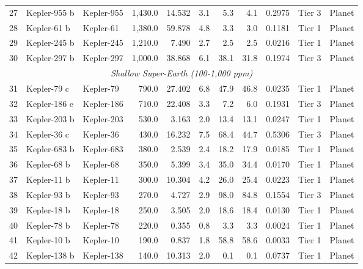{\begin{longtable}{r l l r r r r r r l l}
27 & Kepler-955 b     & Kepler-955   &   1,430.0 &  14.532 &   3.1 &    5.3 &    4.1 &  0.2975 & Tier 3  & Planet \\
28 & Kepler-61 b      & Kepler-61    &   1,380.0 &  59.878 &   4.8 &    3.3 &    3.0 &  0.1181 & Tier 1  & Planet \\
29 & Kepler-245 b     & Kepler-245   &   1,210.0 &   7.490 &   2.7 &    2.5 &    2.5 &  0.0216 & Tier 1  & Planet \\
30 & Kepler-297 b     & Kepler-297   &   1,000.0 &  38.868 &   6.1 &   38.1 &   31.8 &  0.1974 & Tier 3  & Planet \\
\hline
\multicolumn{11}{c}{\textit{Shallow Super-Earth (100-1,000 ppm)}} \\
\hline
31 & Kepler-79 c      & Kepler-79    &     790.0 &  27.402 &   6.8 &   47.9 &   46.8 &  0.0235 & Tier 1  & Planet \\
32 & Kepler-186 e     & Kepler-186   &     710.0 &  22.408 &   3.3 &    7.2 &    6.0 &  0.1931 & Tier 3  & Planet \\
33 & Kepler-203 b     & Kepler-203   &     530.0 &   3.163 &   2.0 &   13.4 &   13.1 &  0.0247 & Tier 1  & Planet \\
34 & Kepler-36 c      & Kepler-36    &     430.0 &  16.232 &   7.5 &   68.4 &   44.7 &  0.5306 & Tier 3  & Planet \\
35 & Kepler-683 b     & Kepler-683   &     380.0 &   2.539 &   2.4 &   18.2 &   17.9 &  0.0185 & Tier 1  & Planet \\
36 & Kepler-68 b      & Kepler-68    &     350.0 &   5.399 &   3.4 &   35.0 &   34.4 &  0.0170 & Tier 1  & Planet \\
37 & Kepler-11 b      & Kepler-11    &     300.0 &  10.304 &   4.2 &   26.0 &   25.4 &  0.0223 & Tier 1  & Planet \\
38 & Kepler-93 b      & Kepler-93    &     270.0 &   4.727 &   2.9 &   98.0 &   84.8 &  0.1554 & Tier 3  & Planet \\
39 & Kepler-18 b      & Kepler-18    &     250.0 &   3.505 &   2.0 &   18.6 &   18.4 &  0.0130 & Tier 1  & Planet \\
40 & Kepler-78 b      & Kepler-78    &     220.0 &   0.355 &   0.8 &    3.3 &    3.3 &  0.0024 & Tier 1  & Planet \\
41 & Kepler-10 b      & Kepler-10    &     190.0 &   0.837 &   1.8 &   58.8 &   58.6 &  0.0033 & Tier 1  & Planet \\
42 & Kepler-138 b     & Kepler-138   &     140.0 &  10.313 &   2.0 &    0.1 &    0.1 &  0.0737 & Tier 1  & Planet \\

\end{longtable}}
